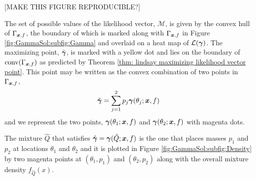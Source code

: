 		[MAKE THIS FIGURE REPRODUCIBLE?]
		
		The set of possible values of the likelihood vector, $\mathcal{M}$, is given by the convex hull of $\Gamma_{{\bm{{x}}}, f}$, the boundary of which is marked along with $\Gamma_{{\bm{{x}}}, f}$ in Figure \ref{fig:GammaSol:subfig:Gamma} and overlaid on a heat map of $\mathcal{L}({\bm{{\gamma}}})$. The maximizing point, $\hat{{\bm{{\gamma}}}}$, is marked with a yellow dot and lies on the boundary of $\mathrm{conv}(\Gamma_{{\bm{{x}}}, f})$ as predicted by Theorem \ref{thm: lindsay maximizing likelihood vector point}. This point may be written as the convex combination of two points in $\Gamma_{{\bm{{x}}}, f}$,
		\begin{equation}
			\hat{{\bm{{\gamma}}}} = \sum_{j = 1}^2 p_j {\bm{{\gamma}}}(\theta_j;{\bm{{x}}}, f)
		\end{equation}
		and we represent the two points, ${\bm{{\gamma}}}(\theta_1;{\bm{{x}}}, f)$ and ${\bm{{\gamma}}}(\theta_2;{\bm{{x}}}, f)$ with magenta dots.

		The mixture $\hat{Q}$ that satisfies $\hat{{\bm{{\gamma}}}} = {\bm{{\gamma}}}(\hat{Q};{\bm{{x}}}, f)$ is the one that places masses $p_1$ and $p_2$ at locations $\theta_1$ and $\theta_2$ and it is plotted in Figure \ref{fig:GammaSol:subfig:Density} by two magenta points at $(\theta_1, p_1)$ and $(\theta_2, p_2)$ along with the overall mixture density $f_{\hat{Q}}(x)$.



